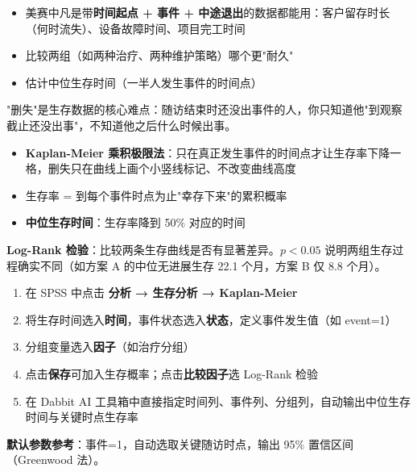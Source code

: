 \begin{algoscene}
\begin{itemize}
    \item 美赛中凡是带\textbf{时间起点 + 事件 + 中途退出}的数据都能用：客户留存时长（何时流失）、设备故障时间、项目完工时间
    \item 比较两组（如两种治疗、两种维护策略）哪个更"耐久"
    \item 估计中位生存时间（一半人发生事件的时间点）
\end{itemize}
\end{algoscene}

\begin{algoprinciple}
"删失"是生存数据的核心难点：随访结束时还没出事件的人，你只知道他"到观察截止还没出事"，不知道他之后什么时候出事。

\begin{itemize}
    \item \textbf{Kaplan-Meier 乘积极限法}：只在真正发生事件的时间点才让生存率下降一格，删失只在曲线上画个小竖线标记、不改变曲线高度
    \item 生存率 = 到每个事件时点为止"幸存下来"的累积概率
    \item \textbf{中位生存时间}：生存率降到 50\% 对应的时间
\end{itemize}

\textbf{Log-Rank 检验}：比较两条生存曲线是否有显著差异。$p<0.05$ 说明两组生存过程确实不同（如方案 A 的中位无进展生存 22.1 个月，方案 B 仅 8.8 个月）。
\end{algoprinciple}

\begin{algosposs}
\begin{enumerate}
    \item 在 SPSS 中点击 \textbf{分析 → 生存分析 → Kaplan-Meier}
    \item 将生存时间选入\textbf{时间}，事件状态选入\textbf{状态}，定义事件发生值（如 event=1）
    \item 分组变量选入\textbf{因子}（如治疗分组）
    \item 点击\textbf{保存}可加入生存概率；点击\textbf{比较因子}选 Log-Rank 检验
    \item 在 Dabbit AI 工具箱中直接指定时间列、事件列、分组列，自动输出中位生存时间与关键时点生存率
\end{enumerate}

\textbf{默认参数参考}：事件=1，自动选取关键随访时点，输出 95\% 置信区间（Greenwood 法）。
\end{algosposs}

